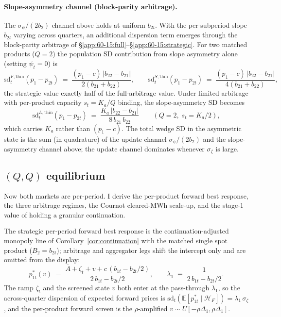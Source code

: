 \documentclass[11pt,a4paper]{article}
\theoremstyle{definition}
\theoremstyle{remark}
\theoremstyle{plain}
\begin{document}
\paragraph{Slope-asymmetry channel (block-parity arbitrage).} The $\sigma_\psi/(2b_2)$ channel above holds at uniform $b_{2t}$. With the per-subperiod slope $b_{2t}$ varying across quarters, an additional dispersion term emerges through the block-parity arbitrage of \S\ref{app:60-15:full}--\S\ref{app:60-15:strategic}. For two matched products ($Q=2$) the population SD contribution from slope asymmetry alone (setting $\psi_t = 0$) is
\begin{equation}
\mathrm{sd}_t^{F,\text{thin}}(p_1 - p_{2t}) \;=\; \frac{(p_1 - c)\,|b_{22} - b_{21}|}{2(b_{21} + b_{22})}, \qquad
\mathrm{sd}_t^{S,\text{thin}}(p_1 - p_{2t}) \;=\; \frac{(p_1 - c)\,|b_{22} - b_{21}|}{4(b_{21} + b_{22})},
\label{eq:wedge-sd-asym-full-strat}
\end{equation}
the strategic value exactly half of the full-arbitrage value. Under limited arbitrage with per-product capacity $s_t = K_a/Q$ binding, the slope-asymmetry SD becomes
\begin{equation}
\mathrm{sd}_t^{L,\text{thin}}(p_1 - p_{2t}) \;=\; \frac{K_a\,|b_{22} - b_{21}|}{8\, b_{21}\, b_{22}} \qquad (Q=2,\; s_t = K_a/2),
\label{eq:wedge-sd-asym-limited}
\end{equation}
which carries $K_a$ rather than $(p_1-c)$. The total wedge SD in the asymmetric state is the sum (in quadrature) of the update channel $\sigma_\psi/(2 b_2)$ and the slope-asymmetry channel above; the update channel dominates whenever $\sigma_\zeta$ is large.

\subsection{$(Q,Q)$ equilibrium}\label{app:state-15-15}

Now both markets are per-period. I derive the per-product forward best response, the three arbitrage regimes, the Cournot cleared-MWh scale-up, and the stage-1 value of holding a granular continuation.

The strategic per-period forward best response is the continuation-adjusted monopoly line of Corollary~\ref{cor:continuation} with the matched single spot product ($B_2 = b_{2t}$); arbitrage and aggregator legs shift the intercept only and are omitted from the display:
\begin{equation}
p_{1t}^*(v) \;=\; \frac{\bar A + \zeta_t + v + c\,(b_{1t} - b_{2t}/2)}{2\, b_{1t} - b_{2t}/2},
\qquad
\lambda_1 \;\equiv\; \frac{1}{2\, b_{1t} - b_{2t}/2}.
\label{eq:p1t-15-15}
\end{equation}
The ramp $\zeta_t$ and the screened state $v$ both enter at the pass-through $\lambda_1$, so the across-quarter dispersion of expected forward prices is $\mathrm{sd}_t(\mathbb{E}[p_{1t}^* \mid \mathcal{H}_F]) = \lambda_1\,\sigma_\zeta$, and the per-product forward screen is the $\rho$-amplified $v \sim U[-\rho\Delta_1, \rho\Delta_1]$.
\end{document}
